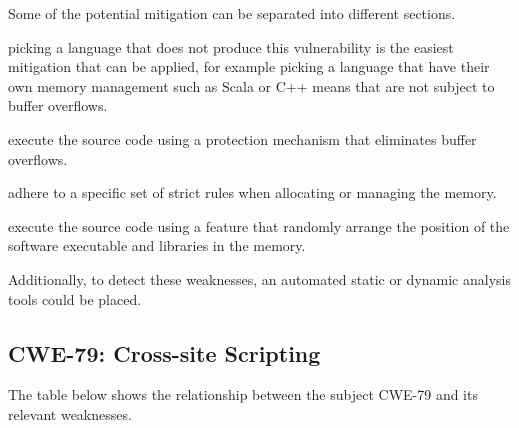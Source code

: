 Some of the potential mitigation can be separated into different sections.

\begin{description}[align=left]
  \item [Requirements] picking a language that does not produce this
  vulnerability is the easiest mitigation that can be applied, for example
  picking a language that have their own memory management such as Scala or C++
  means that are not subject to buffer overflows.
  \item [Build and Compilation] execute the source code using a protection
  mechanism that eliminates buffer overflows.
  \item [Implementation] adhere to a specific set of strict rules when
  allocating or managing the memory.
  \item [Operation] execute the source code using a feature that randomly
  arrange the position of the software executable and libraries in the memory.
\end{description}

Additionally, to detect these weaknesses, an automated static or dynamic
analysis tools could be placed.

\subsection{CWE-79: Cross-site Scripting}
\label{sec:lab4-cwe79}
The table below shows the relationship between the subject CWE-79 and its
relevant weaknesses.

